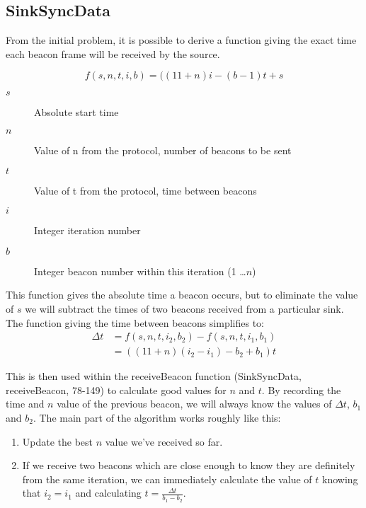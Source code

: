 \documentclass[a4paper,12pt,draft,DIV=calc]{scrartcl}
\begin{document}
\subsection{SinkSyncData}


From the initial problem, it is possible to derive a function giving the exact
time each beacon frame will be received by the source.

\begin{equation*}
  f(s, n, t, i, b) = ((11 + n)i - (b - 1)t + s
\end{equation*}
\begin{description}
  \item[$s$] Absolute start time
  \item[$n$] Value of n from the protocol, number of beacons to be sent
  \item[$t$] Value of t from the protocol, time between beacons
  \item[$i$] Integer iteration number
  \item[$b$] Integer beacon number within this iteration (1 \dots $n$)
\end{description}

This function gives the absolute time a beacon occurs, but to eliminate the
value of $s$ we will subtract the times of two beacons received from a
particular sink. The function giving the time between beacons simplifies to:
\begin{align*}
  \Delta t &= f(s, n, t, i_2, b_2) - f(s, n, t, i_1, b_1) \\
           &= ((11 + n)(i_2 - i_1) - b_2 + b_1)t
\end{align*}

This is then used within the receiveBeacon function (SinkSyncData,
receiveBeacon, 78-149) to calculate good values for $n$ and $t$. By recording
the time and $n$ value of the previous beacon, we will always know the values
of $\Delta t$, $b_1$ and $b_2$. The main part of the algorithm works roughly
like this:

\begin{enumerate}
  \item Update the best $n$ value we've received so far.
  \item If we receive two beacons which are close enough to know they are
          definitely from the same iteration, we can immediately calculate
          the value of $t$ knowing that $i_2 = i_1$ and calculating
          $t = \frac{\Delta t}{b_1 - b_2}$.
\end{enumerate}
\end{document}

